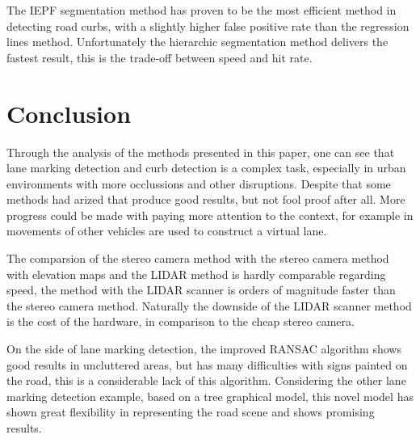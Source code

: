 \begin{table}
\centering
\caption{Method speed evaluation}
\end{table}


The IEPF segmentation method has proven to be the most efficient method in detecting road curbs, with a slightly higher false positive rate than the regression lines method. Unfortunately the hierarchic segmentation method delivers the fastest result, this is the trade-off between speed and hit rate.


\chapter{Conclusion}
Through the analysis of the methods presented in this paper, one can see that lane marking detection and curb detection is a complex task, especially in urban environments with more occlussions and other disruptions. Despite that some methods had arized that produce good results, but not fool proof after all. More progress could be made with paying more attention to the context, for example in \cite{virtuallane} movements of other vehicles are used to construct a virtual lane.

The comparsion of the stereo camera method with the stereo camera method with elevation maps and the LIDAR method is hardly comparable regarding speed, the method with the LIDAR scanner is orders of magnitude faster than the stereo camera method. Naturally the downside of the LIDAR scanner method is the cost of the hardware, in comparison to the cheap stereo camera. 

On the side of lane marking detection, the improved RANSAC algorithm shows good results in uncluttered areas, but has many difficulties with signs painted on the road, this is a considerable lack of this algorithm. Considering the other lane marking detection example, based on a tree graphical model, this novel model has shown great flexibility in representing the road scene and shows promising results.  


\nocite{*}

